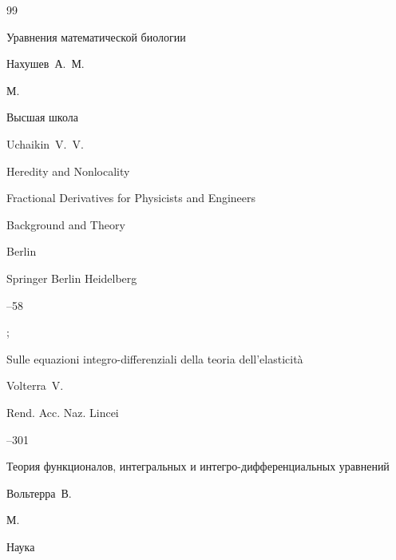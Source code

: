\begin{thebibliography}{99}




\book Уравнения математической биологии

\by Нахушев~А.~М.

\publaddr М.

\publ Высшая школа







\by Uchaikin~V.~V.

\paper Heredity and Nonlocality

\inbook Fractional Derivatives for Physicists and Engineers


\volinfo Background and Theory

\publaddr Berlin

\publ Springer Berlin Heidelberg


--58

;






\paper Sulle equazioni integro-differenziali della teoria dell'elasticit\`a 

\by Volterra~V.

\jour Rend. Acc. Naz. Lincei



–301




\book Теория функционалов, интегральных и интегро-дифференциальных уравнений

\by Вольтерра~В.

\publaddr М.

\publ Наука






\end{thebibliography}
